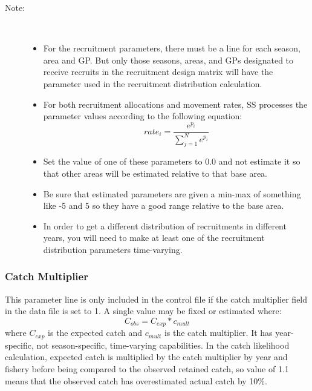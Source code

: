 \begin{description}
	\item[Note:]\
	\begin{itemize}
		\item For the recruitment parameters, there must be a line for each season, area and GP.  But only those seasons, areas, and GPs designated to receive recruits in the recruitment design matrix will have the parameter used in the recruitment distribution calculation.
		\item For both recruitment allocations and movement rates, SS processes the parameter values according to the following equation:
		\begin{equation}
			rate_i = \frac{e^{p_i}}{\sum_{j=1}^{N}e^{p_i}}
		\end{equation}
		\item Set the value of one of these parameters to 0.0 and not estimate it so that other areas will be estimated relative to that base area.
		\item Be sure that estimated parameters are given a min-max of something like -5 and 5 so they have a good range relative to the base area.
		\item In order to get a different distribution of recruitments in different years, you will need to make at least one of the recruitment distribution parameters time-varying.
	\end{itemize}
\end{description}

\subsubsection{Catch Multiplier}
This  parameter line is only included in the control file if the catch multiplier field in the data file is set to 1.  A single value may be fixed or estimated where:
\begin{equation}
C_{obs} = C_{exp} * c_{mult}
\end{equation}
where $C_{exp}$ is the expected catch and $c_{mult}$ is the catch multiplier. It has year-specific, not season-specific, time-varying capabilities.  In the catch likelihood calculation, expected catch is multiplied by the catch multiplier by year and fishery before being compared to the observed retained catch, so value of 1.1 means that the observed catch has overestimated actual catch by 10\%.

